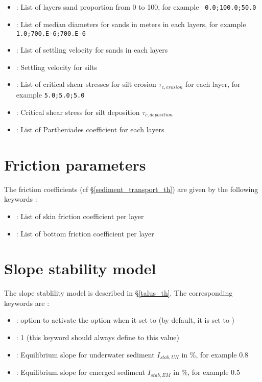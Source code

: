 \subsection{\Csuspension}
\begin{itemize}
	\item {} : List of layers sand proportion from 0 to 100, for example
\verb| 0.0;100.0;50.0|
	\item {} : List of median diameters for sands in meters in each layers, for example \verb|1.0;700.E-6;700.E-6|
	\item {} : List of settling velocity for sands in each layers
	\item {} : Settling velocity for silts
	\item {} : List of critical shear stresses for silt erosion $\tau_{c, erosion}$ for each layer, for example \verb|5.0;5.0;5.0|
	\item {} : Critical shear stress for silt deposition $\tau_{c, deposition}$
	\item {} : List of Partheniades coefficient for each layers
\end{itemize}

\section{Friction parameters}

The friction coefficients (cf \S \ref{sediment_transport_th}) are given by the following keywords :
\begin{itemize}
	\item {} : List of skin friction coefficient per layer
	\item {} : List of bottom friction coefficient per layer
\end{itemize}

\section{Slope stability model}

The slope stablility model is described in \S \ref{talus_th}. The corresponding keywords are :
\begin{itemize}
  \item {} : option to activate the option when it set to  (by default, it is set to )
  \item {} : 1 (this keyword should always define to this value)
	\item {} : Equilibrium slope for underwater sediment $I_{stab, UN}$ in \%, for example 0.8
	\item {} : Equilibrium slope for emerged sediment $I_{stab, EM}$ in \%, for example 0.5
\end{itemize}

